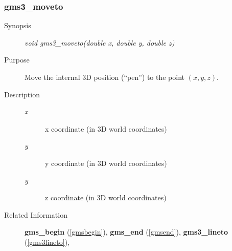 \subsubsection{gms3\_moveto\label{gms3moveto}}
\begin{description}
\item[Synopsis]\mbox{}


{\em void    gms3\_moveto(double x, double y, double z)\/}
\item[Purpose]\mbox{}


Move the internal 3D position (``pen'') to the point $(x,y,z)$.
\item[Description]\mbox{}


\begin{description}
\item[{\em x\/}]\mbox{}

 x coordinate (in 3D world coordinates)
\item[{\em y\/}]\mbox{}

 y coordinate (in 3D world coordinates)
\item[{\em y\/}]\mbox{}

 z coordinate (in 3D world coordinates)
\end{description}

\item[Related Information]\mbox{}


{\bf gms\_begin} (\ref{gmsbegin}), 
{\bf gms\_end} (\ref{gmsend}), 
{\bf gms3\_lineto} (\ref{gms3lineto}),
\end{description}


\newpage



